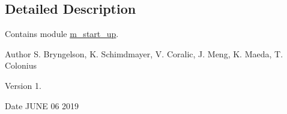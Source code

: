 \subsection{Detailed Description}
Contains module \hyperlink{namespacem__start__up}{m\+\_\+start\+\_\+up}. 

\begin{DoxyAuthor}{Author}
S. Bryngelson, K. Schimdmayer, V. Coralic, J. Meng, K. Maeda, T. Colonius 
\end{DoxyAuthor}
\begin{DoxyVersion}{Version}
1. 
\end{DoxyVersion}
\begin{DoxyDate}{Date}
J\+U\+NE 06 2019 
\end{DoxyDate}

